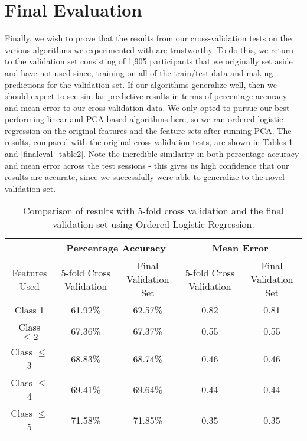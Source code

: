 \section{Final Evaluation}
\label{sec:finaleval}

Finally, we wish to prove that the results from our cross-validation tests on the various algorithms we experimented with are trustworthy.  To do this, we return to the validation set consisting of 1,905 participants that we originally set aside and have not used since, training on all of the train/test data and making predictions for the validation set.  If our algorithms generalize well, then we should expect to see similar predictive results in terms of percentage accuracy and mean error to our cross-validation data.  We only opted to pursue our best-performing linear and PCA-based algorithms here, so we ran ordered logistic regression on the original features and the feature sets after running PCA.  The results, compared with the original cross-validation tests, are shown in Tables \ref{finaleval_table1} and \ref{finaleval_table2}.  Note the incredible similarity in both percentage accuracy and mean error across the test sessions - this gives us high confidence that our results are accurate, since we successfully were able to generalize to the novel validation set.

\begin{table}[p]
\centering
\begin{tabular}{|c|c|c|c|c|}
\hline
& \multicolumn{2}{|c|}{Percentage Accuracy} & \multicolumn{2}{|c|}{Mean Error} \\ \hline
Features Used & 5-fold Cross Validation & Final Validation Set & 5-fold Cross Validation & Final Validation Set \\ \hline
Class 1        & 61.92\% & 62.57\% & 0.82 & 0.81 \\ \hline
Class $\leq 2$ & 67.36\% & 67.37\% & 0.55 & 0.55 \\ \hline
Class $\leq$ 3 & 68.83\% & 68.74\% & 0.46 & 0.46 \\ \hline
Class $\leq$ 4 & 69.41\% & 69.64\% & 0.44 & 0.44 \\ \hline
Class $\leq$ 5 & 71.58\% & 71.85\% & 0.35 & 0.35 \\ \hline
\end{tabular}
\caption{Comparison of results with 5-fold cross validation and the final validation set using Ordered Logistic Regression.}
\label{finaleval_table1}
\end{table}

